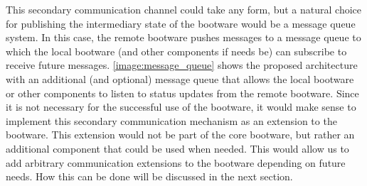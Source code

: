 This secondary communication channel could take any form, but a natural choice for publishing the intermediary state of the bootware would be a message queue system.
In this case, the remote bootware pushes messages to a message queue to which the local bootware (and other components if needs be) can subscribe to receive future messages.
\autoref{image:message_queue} shows the proposed architecture with an additional (and optional) message queue that allows the local bootware or other components to listen to status updates from the remote bootware.
Since it is not necessary for the successful use of the bootware, it would make sense to implement this secondary communication mechanism as an extension to the bootware.
This extension would not be part of the core bootware, but rather an additional component that could be used when needed.
This would allow us to add arbitrary communication extensions to the bootware depending on future needs.
How this can be done will be discussed in the next section.
